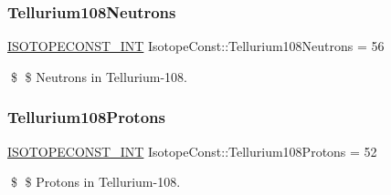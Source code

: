 \subsubsection{\texorpdfstring{Tellurium108\+Neutrons}{Tellurium108Neutrons}}
{\footnotesize\ttfamily \mbox{\hyperlink{group___isotope_const-_macros_ga5f18360b3e99483a35c32d789e62621c}{I\+S\+O\+T\+O\+P\+E\+C\+O\+N\+S\+T\+\_\+\+I\+NT}} Isotope\+Const\+::\+Tellurium108\+Neutrons = 56}

\$ \$ Neutrons in Tellurium-\/108. \mbox{\label{group___isotope_const-_tellurium-_te108_ga767ca344c40437d791b3833fa96869e4}} 
\subsubsection{\texorpdfstring{Tellurium108\+Protons}{Tellurium108Protons}}
{\footnotesize\ttfamily \mbox{\hyperlink{group___isotope_const-_macros_ga5f18360b3e99483a35c32d789e62621c}{I\+S\+O\+T\+O\+P\+E\+C\+O\+N\+S\+T\+\_\+\+I\+NT}} Isotope\+Const\+::\+Tellurium108\+Protons = 52}

\$ \$ Protons in Tellurium-\/108. 